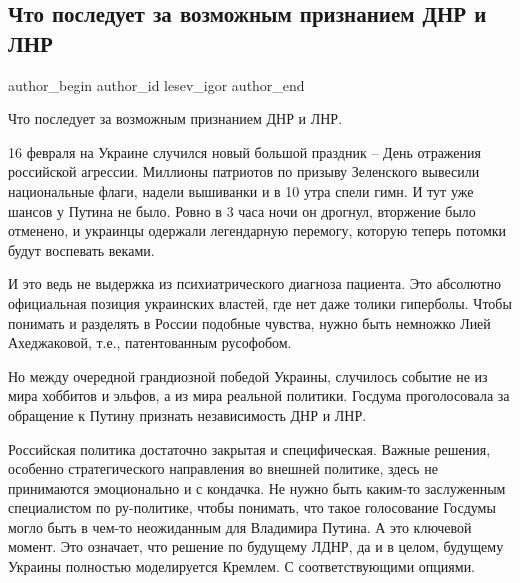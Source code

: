  
 
 
 
 
 
\subsection{Что последует за возможным признанием ДНР и ЛНР}
\label{sec:17_02_2022.tg.lesev_igor.1.chto_posleduet_za_priznaniem_lnr_dnr}
 
\ifcmt
 author_begin
   author_id lesev_igor
 author_end
\fi

Что последует за возможным признанием ДНР и ЛНР.

16 февраля на Украине случился новый большой праздник – День отражения
российской агрессии. Миллионы патриотов по призыву Зеленского вывесили
национальные флаги, надели вышиванки и в 10 утра спели гимн. И тут уже шансов у
Путина не было. Ровно в 3 часа ночи он дрогнул, вторжение было отменено, и
украинцы одержали легендарную перемогу, которую теперь потомки будут воспевать
веками.

И это ведь не выдержка из психиатрического диагноза пациента. Это абсолютно
официальная позиция украинских властей, где нет даже толики гиперболы. Чтобы
понимать и разделять в России подобные чувства, нужно быть немножко Лией
Ахеджаковой, т.е., патентованным русофобом.

Но между очередной грандиозной победой Украины, случилось событие не из мира
хоббитов и эльфов, а из мира реальной политики. Госдума проголосовала за
обращение к Путину признать независимость ДНР и ЛНР.

Российская политика достаточно закрытая и специфическая. Важные решения,
особенно стратегического направления во внешней политике, здесь не принимаются
эмоционально и с кондачка. Не нужно быть каким-то заслуженным специалистом по
ру-политике, чтобы понимать, что такое голосование Госдумы могло быть в чем-то
неожиданным для Владимира Путина. А это ключевой момент. Это означает, что
решение по будущему ЛДНР, да и в целом, будущему Украины полностью моделируется
Кремлем. С соответствующими опциями.

